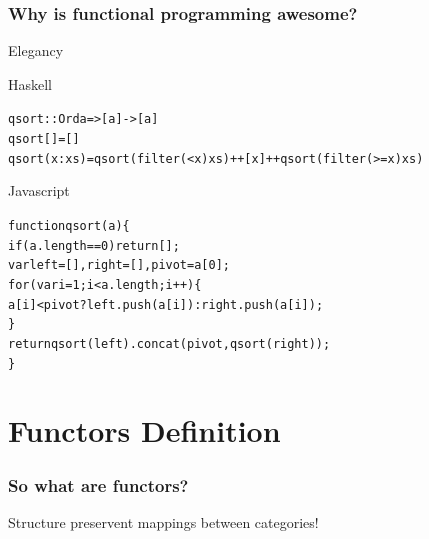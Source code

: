 \documentclass[12pt, xcolor=table]{beamer}
\begin{document}
\begin{frame}
    \frametitle{Why is functional programming awesome?}
    \begin{block}{Elegancy}
        \begin{block}{Haskell}
                \begin{alltt}
                    \begin{tiny}
                    qsort :: Ord a => [a] -> [a]
                    \newline
                    qsort []     = []
                    \newline
                    qsort (x:xs) = qsort (filter (< x) xs) ++ [x] ++ qsort (filter (>= x) xs)
                \end{tiny}
                \end{alltt}
        \end{block}
        \begin{block}{Javascript}
                \begin{alltt}
                    \begin{tiny}
                    function qsort(a) \{ \\
                        if (a.length == 0) return []; \\

                        var left = [], right = [], pivot = a[0];\\

                        for (var i = 1; i < a.length; i++) \{ \\
                            a[i] < pivot ? left.push(a[i]) : right.push(a[i]); \\
                        \} \\

                        return qsort(left).concat(pivot, qsort(right)); \\
                    \}
                    \end{tiny}
                \end{alltt}
        \end{block}
    \end{block}
\end{frame}

\section{Functors Definition}
\begin{frame}
    \frametitle{So what are functors?}
    Structure preservent mappings between categories!
\end{frame}
\end{document}
